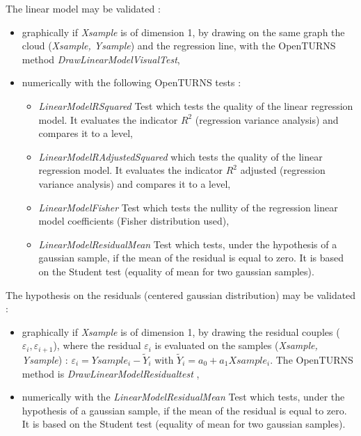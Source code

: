 The linear model may be validated :
\begin{itemize}
\item  graphically if {\itshape Xsample}  is of dimension 1, by drawing on the same graph the cloud ({\itshape Xsample, Ysample}) and the regression line, with the OpenTURNS method {\itshape DrawLinearModelVisualTest},
\item  numerically with the following OpenTURNS tests :
  \begin{itemize}
  \item {\itshape LinearModelRSquared} Test which tests the quality of the linear regression model. It evaluates the indicator $R^2$ (regression variance analysis) and compares it to a level,
  \item {\itshape LinearModelRAdjustedSquared} which  tests the quality of the linear regression model. It evaluates the indicator $R^2$ adjusted (regression variance analysis) and compares it to a level,
  \item {\itshape LinearModelFisher} Test which tests the nullity of the regression linear model coefficients (Fisher distribution used),
  \item {\itshape LinearModelResidualMean} Test which tests, under the hypothesis of a gaussian sample, if the mean of the residual is equal to zero. It is based on the Student test (equality of mean for two gaussian samples).
  \end{itemize}
\end{itemize}

The hypothesis on the residuals (centered gaussian distribution) may be validated :
\begin{itemize}
\item  graphically if {\itshape Xsample} is of dimension 1, by drawing the residual couples ($\varepsilon_i, \varepsilon_{i+1}$), where the residual $\varepsilon_i$ is evaluated on the samples  ({\itshape Xsample, Ysample}) : $\varepsilon_i = Ysample_i - \tilde{Y}_i$ with $\tilde{Y}_i = a_0 + a_1 Xsample_i$. The OpenTURNS method is {\itshape DrawLinearModelResidualtest} ,
\item  numerically with the {\itshape LinearModelResidualMean} Test which tests, under the hypothesis of a gaussian sample, if the mean of the residual is equal to zero. It is based on the Student test (equality of mean for two gaussian samples).
\end{itemize}

